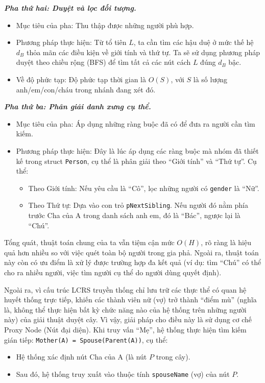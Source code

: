 \textbf{\textit{Pha thứ hai: Duyệt và lọc đối tượng.}}
\begin{itemize}
	\item Mục tiêu của pha: Thu thập được những người phù hợp.
	\item Phương pháp thực hiện: Từ tổ tiên $L$, ta cần tìm các hậu duệ ở mức thế hệ $d_B$ thỏa mãn các điều kiện về giới tính và thứ tự. Ta sẽ sử dụng phương pháp duyệt theo chiều rộng (BFS) để tìm tất cả các nút cách $L$ đúng $d_B$ bậc.
	\item Về độ phức tạp: Độ phức tạp thời gian là $O(S)$, với $S$ là số lượng anh/em/con/cháu trong nhánh đang xét đó.
\end{itemize}

\textbf{\textit{Pha thứ ba: Phân giải danh xưng cụ thể.}}
\begin{itemize}
	\item Mục tiêu của pha: Áp dụng những ràng buộc đã có để đưa ra người cần tìm kiếm.
	\item Phương pháp thực hiện: Đây là lúc áp dụng các ràng buộc mà nhóm đã thiết kế trong struct \texttt{Person}, cụ thể là phân giải theo ``Giới tính'' và ``Thứ tự''. Cụ thể:
	\begin{itemize}
		\item Theo Giới tính: Nếu yêu cầu là ``Cô'', lọc những người có \texttt{gender} là ``Nữ''.
		\item Theo Thứ tự: Dựa vào con trỏ \texttt{pNextSibling}. Nếu người đó nằm phía trước Cha của A trong danh sách anh em, đó là ``Bác'', ngược lại là ``Chú''.
	\end{itemize}
\end{itemize}

Tổng quát, thuật toán chung của ta vẫn tiệm cận mức $O(H)$, rõ ràng là hiệu quả hơn nhiều so với việc quét toàn bộ người trong gia phả. Ngoài ra, thuật toán này còn có ưu điểm là xử lý được trường hợp đa kết quả (ví dụ: tìm ``Chú'' có thể cho ra nhiều người, việc tìm người cụ thể do người dùng quyết định).

Ngoài ra, vì cấu trúc LCRS truyền thống chỉ lưu trữ các thực thể có quan hệ huyết thống trực tiếp, khiến các thành viên nữ (vợ) trở thành ``điểm mù'' (nghĩa là, không thể thực hiện bất kỳ chức năng nào của hệ thống trên những người này) của giải thuật duyệt cây. Vì vậy, giải pháp cho điều này là sử dụng cơ chế Proxy Node (Nút đại diện). Khi truy vấn ``Mẹ'', hệ thống thực hiện tìm kiếm gián tiếp: \texttt{Mother(A) = Spouse(Parent(A))}, cụ thể:
\begin{itemize}
	\item Hệ thống xác định nút Cha của A (là nút $P$ trong cây).
	\item Sau đó, hệ thống truy xuất vào thuộc tính \texttt{spouseName} (vợ) của nút $P$.
\end{itemize}

